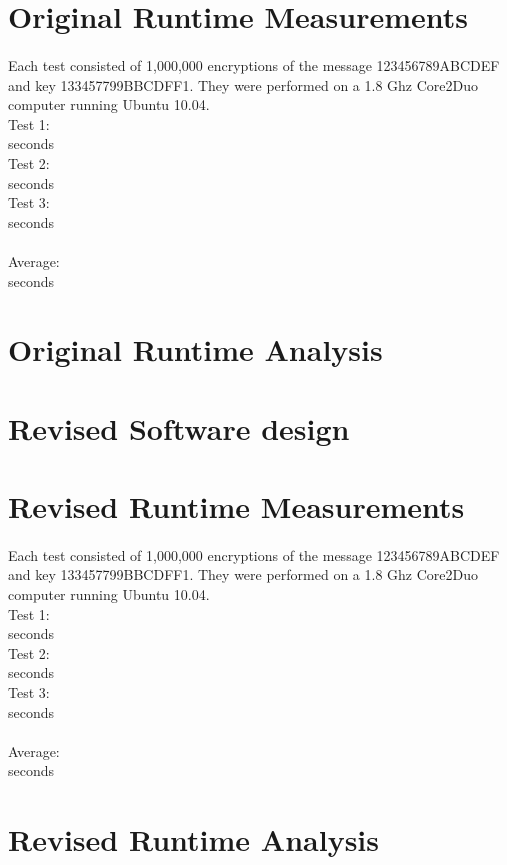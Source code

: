 \documentclass[12pt]{article}
\begin{document}
\section{Original Runtime Measurements}
\paragraph{}Each test consisted of 1,000,000 encryptions of the message 123456789ABCDEF and key 133457799BBCDFF1. They were performed on a 1.8 Ghz Core2Duo computer running Ubuntu 10.04.
\\Test 1:
\\  seconds
\\Test 2:
\\  seconds
\\Test 3:
\\  seconds
\\\\Average:
\\  seconds
\section{Original Runtime Analysis}
\section{Revised Software design}
\section{Revised Runtime Measurements}
\paragraph{}Each test consisted of 1,000,000 encryptions of the message 123456789ABCDEF and key 133457799BBCDFF1. They were performed on a 1.8 Ghz Core2Duo computer running Ubuntu 10.04.
\\Test 1:
\\  seconds
\\Test 2:
\\  seconds
\\Test 3:
\\  seconds
\\\\Average:
\\  seconds
\section{Revised Runtime Analysis}
\end{document}

